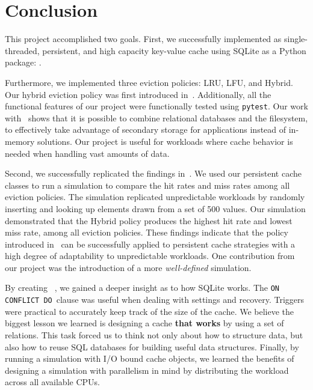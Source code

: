 \section{Conclusion}
This project accomplished two goals. First,
we successfully implemented as single-threaded,
persistent, and high capacity key-value cache using
SQLite as a Python package: \sqlitecache.

Furthermore,
we implemented three eviction policies:
LRU, LFU, and Hybrid. Our hybrid eviction
policy was first introduced in~\cite{shah2023ImprovedCacheEviction}.
Additionally, all the functional features of our project
were functionally tested using \texttt{pytest}.
Our work with \sqlitecache~shows that it is possible to combine
relational databases and the filesystem, to effectively
take advantage of secondary storage for applications instead
of in-memory solutions. Our project is useful for workloads
where cache behavior is needed when handling
vast amounts of data.

Second, we successfully replicated the findings in~\cite{shah2023ImprovedCacheEviction}.
We used our persistent cache classes
to run a simulation to compare the hit rates and miss rates
among all eviction policies. The simulation
replicated unpredictable workloads by randomly inserting
and looking up elements drawn from a set of 500 values.
Our simulation demonstrated that the Hybrid policy
produces the highest hit rate and lowest miss rate, among all eviction policies.
These findings indicate that the policy introduced in~\cite{shah2023ImprovedCacheEviction}
can be successfully applied to persistent cache strategies
with a high degree of adaptability to unpredictable workloads.
One contribution from our project was the introduction
of a more \textit{well-defined} simulation.

By creating \sqlitecache~, we gained a deeper insight
as to how SQLite works. The \texttt{ON CONFLICT DO}~clause
was useful when dealing with settings and recovery.
Triggers were practical to accurately keep track
of the size of the cache. We believe the biggest
lesson we learned is designing a cache \textbf{that works}
by using
a set of relations. This task forced us to think
not only about how to structure data, but also how to
reuse SQL databases for building useful data structures.
Finally, by
running a simulation with I/O bound cache objects, we learned the benefits
of designing a simulation with parallelism in mind
by distributing the workload across all
available CPUs.

